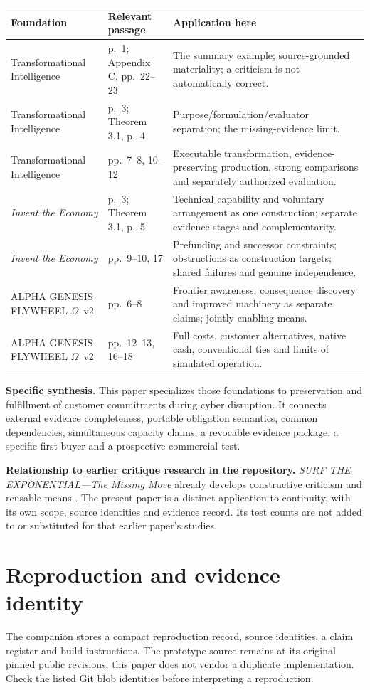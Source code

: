 \documentclass[11pt,a4paper]{article}
\newcommand{\ti}{Transformational Intelligence}
\newcommand{\genesis}{ALPHA GENESIS FLYWHEEL $\Omega$}
\newcommand{\chapterpage}{\clearpage}
\begin{document}
\begin{longtable}{P{.28\textwidth}P{.24\textwidth}P{.40\textwidth}}
\toprule
\textbf{Foundation} & \textbf{Relevant passage} & \textbf{Application here}\\
\midrule
\endhead
\ti & p.~1; Appendix C, pp.~22--23 & The summary example; source-grounded materiality; a criticism is not automatically correct.\\
\ti & p.~3; Theorem 3.1, p.~4 & Purpose/formulation/evaluator separation; the missing-evidence limit.\\
\ti & pp.~7--8, 10--12 & Executable transformation, evidence-preserving production, strong comparisons and separately authorized evaluation.\\
\emph{Invent the Economy} & p.~3; Theorem 3.1, p.~5 & Technical capability and voluntary arrangement as one construction; separate evidence stages and complementarity.\\
\emph{Invent the Economy} & pp.~9--10, 17 & Prefunding and successor constraints; obstructions as construction targets; shared failures and genuine independence.\\
\genesis\ v2 & pp.~6--8 & Frontier awareness, consequence discovery and improved machinery as separate claims; jointly enabling means.\\
\genesis\ v2 & pp.~12--13, 16--18 & Full costs, customer alternatives, native cash, conventional ties and limits of simulated operation.\\
\bottomrule
\end{longtable}

\textbf{Specific synthesis.} This paper specializes those foundations to preservation and fulfillment of customer commitments during cyber disruption. It connects external evidence completeness, portable obligation semantics, common dependencies, simultaneous capacity claims, a revocable evidence package, a specific first buyer and a prospective commercial test.

\textbf{Relationship to earlier critique research in the repository.} \emph{SURF THE EXPONENTIAL---The Missing Move} already develops constructive criticism and reusable means \cite{boucherSurf}. The present paper is a distinct application to continuity, with its own scope, source identities and evidence record. Its test counts are not added to or substituted for that earlier paper's studies.

\chapterpage
\section{Reproduction and evidence identity}\label{app:reproduction}
The companion stores a compact reproduction record, source identities, a claim register and build instructions. The prototype source remains at its original pinned public revisions; this paper does not vendor a duplicate implementation. Check the listed Git blob identities before interpreting a reproduction.
\end{document}

